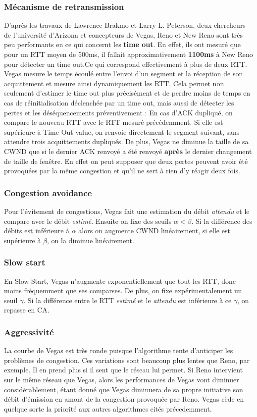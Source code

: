\documentclass[	DIV=calc,%
							paper=a4,%
							fontsize=11pt,%
							twocolumn]{scrartcl}	 					%
\begin{document}
\subsubsection*{Mécanisme de retransmission}
D'après les travaux de Lawrence Brakmo et Larry L. Peterson, deux chercheurs de l'université d'Arizona et concepteurs de Vegas, Reno et New Reno sont très peu performants en ce qui concernt les \textbf{time out}. En effet, ils ont mesuré que pour un RTT moyen de 500ms, il fallait approximativement \textbf{1100ms} à New Reno pour détecter un time out\cite{Brakmo94}.Ce qui correspond effectivement à plus de deux RTT. Vegas mesure le temps écoulé entre l'envoi d'un segment et la réception de son acquittement et mesure ainsi dynamiquement les RTT.
Cela permet non seulement d'estimer le time out plus précisément et de perdre moins de temps en cas de réinitialisation déclenchée par un time out, mais aussi de détecter les pertes et les déséquencements préventivement :
En cas d'ACK dupliqué, on compare le nouveau RTT avec le RTT mesuré précédemment. Si elle est supérieure à Time Out value, on renvoie directement le segment suivant, sans attendre trois acquittements dupliqués.
De plus, Vegas ne diminue la taille de sa CWND que si le dernier ACK renvoyé a été renvoyé \textbf{après} le dernier changement de taille de fenêtre. En effet on peut supposer que deux pertes peuvent avoir été provoquées par la même congestion et qu'il ne sert à rien d'y réagir deux fois.
\subsubsection*{Congestion avoidance}
Pour l'évitement de congestions, Vegas fait une estimation du débit \textit{attendu} et le compare avec le débit \textit{estimé}. Ensuite on fixe des seuils $\alpha<\beta$. Si la différence des débits est inférieure à $\alpha$ alors on augmente CWND linéairement, si elle est supérieure à $ \beta $, on la diminue linéairement.
\subsubsection*{Slow start}
En Slow Start, Vegas n'augmente exponentiellement que tout les RTT, donc moins fréquemment que ses comparses. De plus, on fixe expérimentalement un seuil $\gamma$. Si la différence entre le RTT \textit{estimé} et le \textit{attendu} est inférieure à ce $\gamma$, on repasse en CA.
\subsubsection*{Aggressivité}
La courbe de Vegas est très ronde puisque l'algorithme tente d'anticiper les problèmes de congestion. Ces variations sont beaucoup plus lentes que Reno, par exemple. Il en prend plus si il sent que le réseau lui permet. Si Reno intervient sur le même réseau que Vegas, alors les performances de Vegas vont diminuer considérablement, étant donné que Vegas diminuera de sa propre initiative son débit d'émission en amont de la congestion provoquée par Reno. Vegas cède en quelque sorte la priorité aux autres algorithmes cités précedemment.
\end{document}
